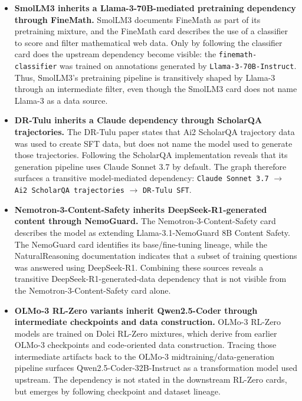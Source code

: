 \begin{itemize}
    \item \textbf{SmolLM3 inherits a Llama-3-70B-mediated pretraining dependency through FineMath.}
    SmolLM3 documents FineMath as part of its pretraining mixture, and the FineMath card describes the use of a classifier to score and filter mathematical web data. Only by following the classifier card does the upstream dependency become visible: the \texttt{finemath-classifier} was trained on annotations generated by \texttt{Llama-3-70B-Instruct}. Thus, SmolLM3's pretraining pipeline is transitively shaped by Llama-3 through an intermediate filter, even though the SmolLM3 card does not name Llama-3 as a data source.

    \item \textbf{DR-Tulu inherits a Claude dependency through ScholarQA trajectories.}
    The DR-Tulu paper states that Ai2 ScholarQA trajectory data was used to create SFT data, but does not name the model used to generate those trajectories. Following the ScholarQA implementation reveals that its generation pipeline uses Claude Sonnet 3.7 by default. The graph therefore surfaces a transitive model-mediated dependency: \texttt{Claude Sonnet 3.7} $\rightarrow$ \texttt{Ai2 ScholarQA trajectories} $\rightarrow$ \texttt{DR-Tulu SFT}.

    \item \textbf{Nemotron-3-Content-Safety inherits DeepSeek-R1-generated content through NemoGuard.}
    The Nemotron-3-Content-Safety card describes the model as extending Llama-3.1-NemoGuard 8B Content Safety. The NemoGuard card identifies its base/fine-tuning lineage, while the NaturalReasoning documentation indicates that a subset of training questions was answered using DeepSeek-R1. Combining these sources reveals a transitive DeepSeek-R1-generated-data dependency that is not visible from the Nemotron-3-Content-Safety card alone.

    \item \textbf{OLMo-3 RL-Zero variants inherit Qwen2.5-Coder through intermediate checkpoints and data construction.}
    OLMo-3 RL-Zero models are trained on Dolci RL-Zero mixtures, which derive from earlier OLMo-3 checkpoints and code-oriented data construction. Tracing those intermediate artifacts back to the OLMo-3 midtraining/data-generation pipeline surfaces Qwen2.5-Coder-32B-Instruct as a transformation model used upstream. The dependency is not stated in the downstream RL-Zero cards, but emerges by following checkpoint and dataset lineage.

\end{itemize}

